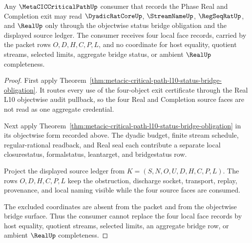 \begin{theorem}
\label{thm:metacic-critical-path-l10-objectwise-status-consumer}
Any $\MetaCICCriticalPathUp$ consumer that records the Phase Real and Completion exit may read $\DyadicRatCoreUp$, $\StreamNameUp$, $\RegSeqRatUp$, and $\RealUp$ only through the objectwise status bridge obligation and the displayed source ledger. The consumer receives four local face records, carried by the packet rows $O,D,H,C,P,L$, and no coordinate for host equality, quotient streams, selected limits, aggregate bridge status, or ambient $\RealUp$ completeness.
\end{theorem}
\begin{proof}
First apply Theorem~\ref{thm:metacic-critical-path-l10-status-bridge-obligation}. It routes every use of the four-object exit certificate through the Real L10 objectwise audit pullback, so the four Real and Completion source faces are not read as one aggregate credential.

Next apply Theorem~\ref{thm:metacic-critical-path-l10-status-bridge-obligation} in its objectwise form recorded above. The dyadic budget, finite stream schedule, regular-rational readback, and Real seal each contribute a separate local closurestatus, formalstatus, leantarget, and bridgestatus row.

Project the displayed source ledger from $K=(S,N,O,U,D,H,C,P,L)$. The rows $O,D,H,C,P,L$ keep the obstruction, discharge socket, transport, replay, provenance, and local naming visible while the four source faces are consumed.

The excluded coordinates are absent from the packet and from the objectwise bridge surface. Thus the consumer cannot replace the four local face records by host equality, quotient streams, selected limits, an aggregate bridge row, or ambient $\RealUp$ completeness.
\end{proof}

